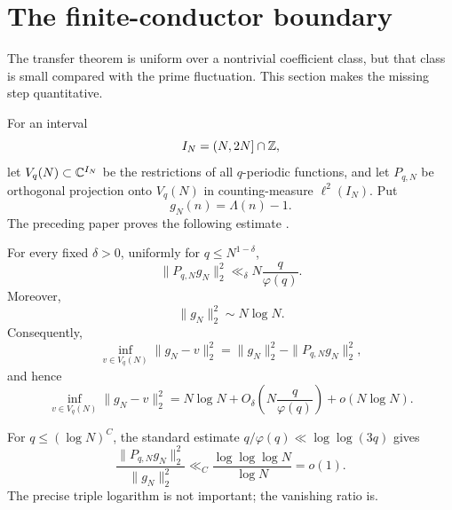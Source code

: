 \section{The finite-conductor boundary}
\label{sec:conductor-boundary}

The transfer theorem is uniform over a nontrivial coefficient class, but
that class is small compared with the prime fluctuation.  This section makes
the missing step quantitative.

For an interval
\begin{equation}\label{eq:I-N}
 I_N=(N,2N]\cap\mathbb Z,
\end{equation}
let $V_q(N)\subset\mathbb C^{I_N}$ be the restrictions of all $q$-periodic
functions, and let $P_{q,N}$ be orthogonal projection onto $V_q(N)$ in
counting-measure $\ell^2(I_N)$.  Put
\begin{equation}\label{eq:prime-fluctuation}
 g_N(n)=\Lambda(n)-1.
\end{equation}
The preceding paper proves the following estimate
\citep{WangTPCSeven2026}.

\begin{theorem}
\label{thm:recalled-energy-escape}
For every fixed $\delta>0$, uniformly for $q\leq N^{1-\delta}$,
\begin{equation}\label{eq:projection-energy}
 \|P_{q,N}g_N\|_2^2
 \ll_\delta N\frac{q}{\varphi(q)}.
\end{equation}
Moreover,
\begin{equation}\label{eq:full-prime-energy}
 \|g_N\|_2^2\sim N\log N.
\end{equation}
Consequently,
\begin{equation}\label{eq:orthogonal-best-approximation}
 \inf_{v\in V_q(N)}\|g_N-v\|_2^2
 =\|g_N\|_2^2-\|P_{q,N}g_N\|_2^2,
\end{equation}
and hence
\begin{equation}\label{eq:best-periodic-approximation}
 \inf_{v\in V_q(N)}\|g_N-v\|_2^2
 =N\log N+O_\delta\!\left(N\frac{q}{\varphi(q)}\right)
 +o(N\log N).
\end{equation}
\end{theorem}

For $q\leq(\log N)^C$, the standard estimate
$q/\varphi(q)\ll\log\log(3q)$ gives
\begin{equation}\label{eq:polylog-energy-ratio}
 \frac{\|P_{q,N}g_N\|_2^2}{\|g_N\|_2^2}
 \ll_C\frac{\log\log\log N}{\log N}=o(1).
\end{equation}
The precise triple logarithm is not important; the vanishing ratio is.

